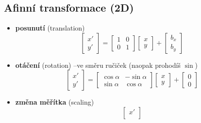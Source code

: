 \subsection{Afinní transformace (2D)}
\begin{itemize}
	\item \textbf{posunutí} (translation)
	\begin{equation*}
 \begin{bmatrix}     
 x'   \\[0.3em]      
 y'
 \end{bmatrix} = 
 \begin{bmatrix}
     1 & 0     \\[0.3em]
     0 & 1        
  \end{bmatrix}
  \begin{bmatrix}
     x     \\[0.3em]
     y        
     \end{bmatrix} +
      \begin{bmatrix}
     b_x     \\[0.3em]
     b_y        
     \end{bmatrix}
\end{equation*}
	\item \textbf{otáčení} (rotation) --ve směru ručiček (naopak prohodíš $\sin$)
					\begin{equation*}
				 \begin{bmatrix}     
				 x'   \\[0.3em]      
				 y'
				 \end{bmatrix} = 
				 \begin{bmatrix}
				     \cos{\alpha} & -\sin{\alpha}     \\[0.3em]
				     \sin{\alpha} & \cos{\alpha}        
				  \end{bmatrix}
				  \begin{bmatrix}
				     x     \\[0.3em]
				     y        
				     \end{bmatrix} +
				      \begin{bmatrix}
				     0     \\[0.3em]
				     0        
				     \end{bmatrix}
					\end{equation*}
	\item \textbf{změna měřítka} (scaling)
				\begin{equation*}
			 \begin{bmatrix}     
			 x'   \\[0.3em]      

\end{bmatrix}
\end{equation*}
\end{itemize}
